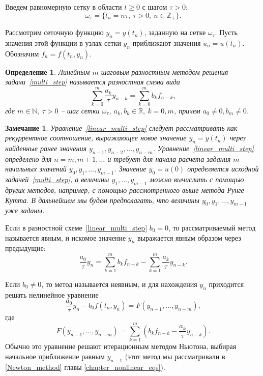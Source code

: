 \documentclass[11pt,a4paper,twoside]{report}
\numberwithin{equation}{section}
\newtheorem*{definition}{Определение}
\theoremstyle{definition}
\theoremstyle{plain}
\newtheorem*{note*}{Замечание}
\begin{document}
Введем равномерную сетку в области $t\geqslant 0$ с шагом $\tau > 0$:
%
$$
    \omega_\tau=\{t_n=n\tau,~\tau > 0,~n\in\mathbb{Z}_+\}.
$$

Рассмотрим сеточную функцию $y_n = y(t_n)$, заданную
на сетке $\omega_\tau$. Пусть значения этой функции в узлах сетки $y_n$ приближают
значения $u_n=u(t_n)$. Обозначим $f_n=f(t_n,y_n)$.

\begin{definition}
%
    Линейным $m$-шаговым разностным методом решения задачи~\eqref{multi_step}
    называется разностная схема вида
    \begin{equation}
        \label{linear_multi_step}
        \sum_{k=0}^m \frac{a_k}{\tau} y_{n-k} = \sum_{k=0}^m b_k f_{n-k},
    \end{equation}
    где $m\in\mathbb{N}$, $\tau > 0$ -- шаг сетки $\omega_\tau$, $a_k, b_k \in\mathbb{R},~k=\overline{0,m}$,
    причем $a_0 \not= 0, b_m \not= 0$.
%
\end{definition}
%


%
\begin{note*}
%
    Уравнение~\eqref{linear_multi_step} следует рассматривать как рекуррентное
    соотношение, выражающее новое значение $y_n=y(t_n)$ через найденные ранее
    значения $y_{n-1}, y_{n-2},\ldots, y_{n-m}$. Уравнение~\eqref{linear_multi_step}
    определено для $n = m, m+1, \ldots$\; и требует для начала расчета задания $m$
    начальных значений $y_0, y_1, \ldots, y_{m-1}$. Значение $y_0=u(0)$ определяется
    исходной задачей~\eqref{multi_step}, а величины $y_1,\ldots,y_{m-1}$ можно вычислить
    с помощью других методов, например, с помощью рассмотренного выше метода Рунге--Кутта.
    В дальнейшем мы будем предполагать,
    что величины $y_0, y_1, \ldots, y_{m-1}$ уже заданы.
%
\end{note*}
%
Если в разностной схеме~\eqref{linear_multi_step} $b_0=0$,
то рассматриваемый метод называется явным, и искомое значение $y_n$
выражается явным образом через предыдущие:
%
$$
    \frac{a_0}{\tau} y_{n} = \sum_{k=1}^m b_kf_{n-k}-\sum_{k=1}^m \frac{a_k}
    {\tau}y_{n-k}.
$$
%

Если $b_0 \neq 0$, то метод называется неявным,
и для нахождения $y_n$ приходится решать нелинейное уравнение
%
$$
    \frac{a_0}{\tau} y_{n} - b_0f(t_n,y_n)=F(y_{n-1},\ldots,y_{n-m}),
$$
%
где
%
$$
    F(y_{n-1},\ldots,y_{n-m})=\sum_{k=1}^m(b_kf_{n-k}-\frac{a_k}{\tau}
    y_{n-k}).
$$
%
Обычно это уравнение решают итерационным методом Ньютона, выбирая начальное
приближение равным $y_{n-1}$  (этот метод мы рассматривали
в \ref{Newton_method} главы \ref{chapter_nonlinear_eqs}).
\end{document}
